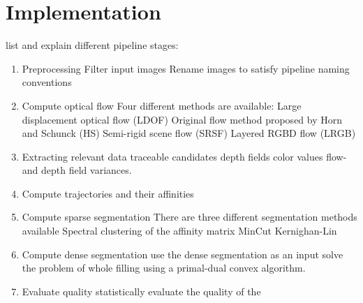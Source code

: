 \chapter{Implementation}

list and explain different pipeline stages:

\begin{enumerate}
\item Preprocessing
	\subitem Filter input images
	\subitem Rename images to satisfy pipeline naming conventions 
\item Compute optical flow
	\subitem Four different methods are available:
	\subitem Large displacement optical flow (LDOF)
	\subitem Original flow method proposed by Horn and Schunck (HS)
	\subitem Semi-rigid scene flow (SRSF)
	\subitem Layered RGBD flow (LRGB)
\item Extracting relevant data
	\subitem traceable candidates
	\subitem depth fields
	\subitem color values
	\subitem flow-and depth field variances.
\item Compute trajectories and their affinities
\item Compute sparse segmentation
	\subitem There are three different segmentation methods available
	\subitem Spectral clustering of the affinity matrix
	\subitem MinCut
	\subitem Kernighan-Lin 
\item Compute dense segmentation
	\subitem use the dense segmentation as an input solve the problem of whole filling using a primal-dual convex algorithm. 
\item Evaluate quality
	\subitem statistically evaluate the quality of the  
\end{enumerate}
